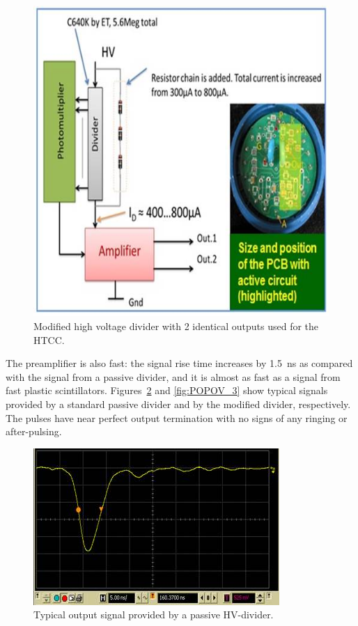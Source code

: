 \begin{figure}[!ht]
    \centering
    \includegraphics[width=1.0\linewidth,trim={0.0cm 0.0cm 0.0cm 0.0cm},clip]{images/POPOV_1.jpg}
    \caption{Modified high voltage divider with 2 identical outputs used for the HTCC.}
    \label{fig:POPOV_1}
\end{figure}

The preamplifier is also fast: the signal rise time increases by 1.5~ns as compared with the signal from a passive
divider, and it is almost as fast as a signal from fast plastic scintillators. Figures~\ref{fig:POPOV_2} and
\ref{fig:POPOV_3} show typical signals provided by a standard passive divider and by the modified divider,
respectively. The pulses have near perfect output termination with no signs of any ringing or after-pulsing.

\begin{figure}[!ht]
    \centering
    \includegraphics[width=1.0\linewidth,trim={0.0cm 0.0cm 0.0cm 0.0cm},clip]{images/POPOV_2.jpg}
    \caption{Typical output signal provided by a passive HV-divider.}
    \label{fig:POPOV_2}
\end{figure}

